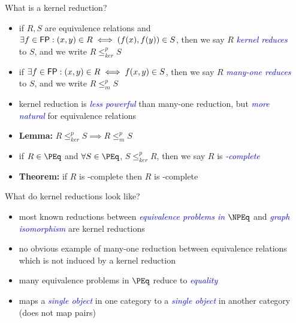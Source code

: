 \documentclass[final]{beamer}
\newcommand{\emphblue}[1]{\emph{\textcolor{blue}{#1}}}
\newcommand{\kr}{\leq_{ker}^p}
\newcommand{\mor}{\leq_{m}^p}
\begin{document}
\begin{frame}{}
\begin{columns}[t]
\begin{column}{.3\linewidth}
    \end{column}

    \begin{column}{.3\linewidth}
      \begin{block}{\LARGE What is a kernel reduction?}
        \begin{itemize}\Large
        \item if $R,S$ are equivalence relations and $\exists f\in{\ensuremath{\mathsf{FP}}}: (x,y)\in
          R\iff(f(x),f(y))\in S$, then we say $R$ \emphblue{kernel reduces} to
          $S$, and we write $R\kr S$
        \item if $\exists f\in{\ensuremath{\mathsf{FP}}}: (x,y)\in R\iff f(x,y)\in S$, then we say $R$
          \emphblue{many-one reduces} to $S$, and we write $R\mor S$
        \item kernel reduction is \emphblue{less powerful} than many-one
          reduction, but \emphblue{more natural} for equivalence relations
        \item \textbf{Lemma:} $R\kr S\implies R\mor S$
        \item if $R\in\PEq$ and $\forall S\in\PEq$, $S\kr R$, then we say $R$
          is \emphblue{\PEq-complete}
        \item \textbf{Theorem:} if $R$ is \NPEq-complete then $R$ is
          \NP-complete
        \end{itemize}
      \end{block}

      \vspace{1.8in}

      \begin{block}{\LARGE What do kernel reductions look like?}
        \begin{itemize}\Large
        \item most known reductions between \emphblue{equivalence problems in
          $\NPEq$} and \emphblue{graph isomorphism} are kernel reductions
        \item no obvious example of many-one reduction between equivalence
          relations which is not induced by a kernel reduction
        \item many equivalence problems in $\PEq$ reduce to \emphblue{equality}
        \item maps a \emphblue{single object} in one category to a
          \emphblue{single object} in another category (does not map pairs)
        \end{itemize}
      \end{block}


\end{column}
\end{columns}
\end{frame}
\end{document}
